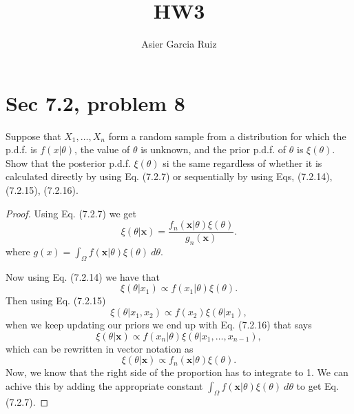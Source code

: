 \documentclass{article}
\title{HW3}
\author{Asier Garcia Ruiz}
\newcommand{\randsamp}{X_1,\dots,X_n}
\newenvironment{hwproof}[1]
{
    #1
    \begin{proof}
}{
    \end{proof}
}
\begin{document}
\maketitle

\section{Sec 7.2, problem 8}
\begin{hwproof}
    {
        Suppose that $\randsamp$ form a random sample from a distribution for which
        the p.d.f. is $f(x | \theta)$, the value of $\theta$ is unknown, and the
        prior p.d.f. of $\theta$ is $\xi(\theta)$. Show that the posterior p.d.f.
        $\xi(\theta)$ si the same regardless of whether it is calculated directly
        by using Eq. (7.2.7) or sequentially by using Eqs, (7.2.14), (7.2.15),
        (7.2.16).
    }

    Using Eq. (7.2.7) we get
    \begin{equation*}
        \xi(\theta | \bm{x}) = \frac{f_n(\bm{x}|\theta) \xi(\theta)}{g_n(\bm{x})}.
    \end{equation*}
    where $g(x) = \int_\Omega f(\bm{x} | \theta) \xi(\theta) \ d\theta$.

    Now using Eq. (7.2.14) we have that
    \begin{equation*}
        \xi(\theta | x_1) \propto f(x_1 | \theta)\xi(\theta).
    \end{equation*}
    Then using Eq. (7.2.15)
    \begin{equation*}
        \xi(\theta | x_1, x_2) \propto f(x_2) \xi(\theta | x_1),
    \end{equation*}
    when we keep updating our priors we end up with Eq. (7.2.16) that says
    \begin{equation*}
        \xi(\theta | \bm{x}) \propto f(x_n | \theta) \xi(\theta | x_1, \dots , x_{n-1}),
    \end{equation*}
    which can be rewritten in vector notation as
    \begin{equation*}
        \xi(\theta | \bm{x}) \propto f_n(\bm{x} | \theta) \xi(\theta).
    \end{equation*}
    Now, we know that the right side of the proportion has to integrate to 1.
    We can achive this by adding the appropriate constant
    $\int_\Omega f(\bm{x} | \theta) \xi(\theta) \ d\theta$ to get
    Eq. (7.2.7).
\end{hwproof}
\end{document}
